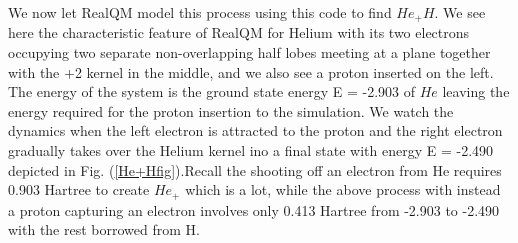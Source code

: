 \documentclass[11pt]{article} %
\begin{document}
We now let RealQM model this process using this code \cite{He+Hcode} to find $He_+H$. We see here the characteristic feature of RealQM for Helium with its two electrons occupying two separate non-overlapping half lobes meeting at a plane together with the +2 kernel in the middle,  and we also see a proton inserted on the left.  The energy of the system is the ground state energy E = -2.903 of $He$ leaving the energy required for the proton insertion to the simulation.  We watch the dynamics when the left electron is attracted to the proton and the right electron gradually takes over the Helium kernel ino a final state with energy E = -2.490 depicted in Fig. (\ref{He+Hfig}).Recall the shooting off an electron from He requires 0.903 Hartree to create $He_+$ which is a lot,  while the above process with instead a proton capturing an electron involves only 0.413 Hartree from -2.903 to -2.490 with the rest borrowed from H. 






\
\end{document}
